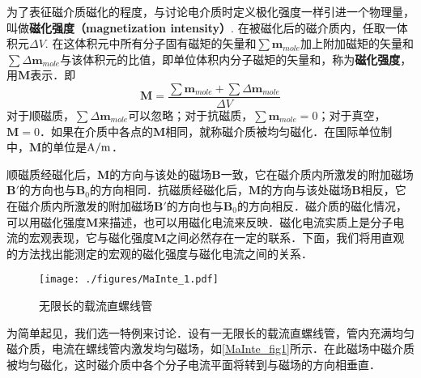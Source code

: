 
为了表征磁介质磁化的程度，与讨论电介质时定义极化强度一样引进一个物理量，叫做\textbf{磁化强度（magnetization intensity）}. 在被磁化后的磁介质内，任取一体积元$\Delta V$. 在这体积元中所有分子固有磁矩的矢量和$\sum \mathbf{m}_{mole}$加上附加磁矩的矢量和$\sum \Delta\mathbf{m}_{mole}$与该体积元的比值，即单位体积内分子磁矩的矢量和，称为\textbf{磁化强度}，用$\mathbf M$表示．即
\begin{equation}
\mathbf M=\frac{\sum \mathbf m_{mole}+\sum \Delta \mathbf m_{mole}}{\Delta V}
\end{equation}
对于顺磁质，$\sum \Delta\mathbf{m}_{mole}$可以忽略；对于抗磁质，$\sum \mathbf{m}_{mole}=0$；对于真空，$\mathbf M=0$．如果在介质中各点的$\mathbf M $相同，就称磁介质被均匀磁化．在国际单位制中，$\mathbf M$的单位是$\rm A/m$．

顺磁质经磁化后，$\mathbf M $的方向与该处的磁场$\mathbf B $一致，它在磁介质内所激发的附加磁场$\mathbf B' $的方向也与$\mathbf B_0$的方向相同．抗磁质经磁化后，$\mathbf M $的方向与该处磁场$\mathbf B $相反，它在磁介质内所激发的附加磁场$\mathbf B' $的方向也与$\mathbf B_0 $的方向相反．磁介质的磁化情况，可以用磁化强度$\mathbf M $来描述，也可以用磁化电流来反映．磁化电流实质上是分子电流的宏观表现，它与磁化强度$\mathbf M $之间必然存在一定的联系．下面，我们将用直观的方法找出能测定的宏观的磁化强度与磁化电流之间的关系．
\begin{figure}[ht]
\centering
\texttt{[image: ./figures/MaInte\_1.pdf]}
\caption{无限长的载流直螺线管} \label{MaInte_fig1}
\end{figure}
为简单起见，我们选一特例来讨论．设有一无限长的载流直螺线管，管内充满均匀磁介质，电流在螺线管内激发均匀磁场，如\autoref{MaInte_fig1}所示．在此磁场中磁介质被均匀磁化，这时磁介质中各个分子电流平面将转到与磁场的方向相垂直．

